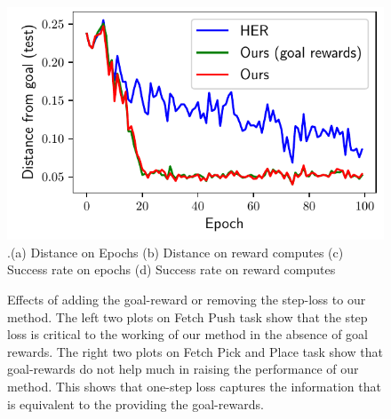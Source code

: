 \begin{figure}
  \includegraphics[width=\frac\columnwidth]{media/res/ablate-ours-with-goal-reward/FetchPickAndPlace-dqstepoch-test/ag_g_dist.pdf}%
  {.\tiny\color{blue}\hspace{0.8cm}(a) Distance on Epochs \hspace{1.05cm}(b) Distance on
    reward computes
    \hspace{0.70cm} (c) Success rate on epochs \hspace{0.9cm} (d) Success rate on reward computes}
  \caption{
    Effects of adding the goal-reward or removing the step-loss to our method.
    The left two plots on Fetch Push task show that the step loss is critical to the working of our
    method in the absence of goal rewards.
    The right two plots on Fetch Pick and Place task show that goal-rewards do not help much in raising the
    performance of our method. This shows that one-step loss captures the
    information that is equivalent to the providing the goal-rewards.}
  \label{fig:with-and-without-step-loss}%
\end{figure}%
% 

